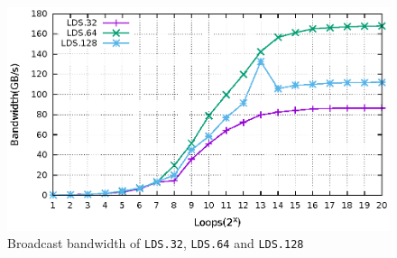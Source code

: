 \documentclass{sig-alternate-05-2015}
\begin{document}
\begin{figure}[htbp]
\begin{center}
\includegraphics[scale=0.6]{lds_broadcast_bandwidth}
    \caption{ Broadcast bandwidth of {\tt LDS.32}, {\tt LDS.64} and {\tt LDS.128}}
\label{fig:lds_brd_bw}
\end{center}
\end{figure}
\end{document}
